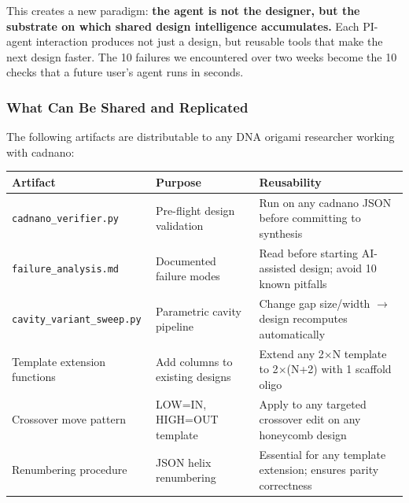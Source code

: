 \documentclass[
  11pt,
]{article}
\newcounter{none} %
\begin{document}
This creates a new paradigm: \textbf{the agent is not the designer, but
the substrate on which shared design intelligence accumulates.} Each
PI-agent interaction produces not just a design, but reusable tools that
make the next design faster. The 10 failures we encountered over two
weeks become the 10 checks that a future user's agent runs in seconds.

\subsubsection{What Can Be Shared and
Replicated}\label{what-can-be-shared-and-replicated}

The following artifacts are distributable to any DNA origami researcher
working with cadnano:

{\def\LTcaptype{none} %
\begin{longtable}[]{@{}
  >{\raggedright\arraybackslash}p{}
  >{\raggedright\arraybackslash}p{}
  >{\raggedright\arraybackslash}p{}@{}}
\toprule\noalign{}
\begin{minipage}[b]{\linewidth}\raggedright
Artifact
\end{minipage} & \begin{minipage}[b]{\linewidth}\raggedright
Purpose
\end{minipage} & \begin{minipage}[b]{\linewidth}\raggedright
Reusability
\end{minipage} \\
\midrule\noalign{}
\endhead
\bottomrule\noalign{}
\endlastfoot
\texttt{cadnano\_verifier.py} & Pre-flight design validation & Run on
any cadnano JSON before committing to synthesis \\
\texttt{failure\_analysis.md} & Documented failure modes & Read before
starting AI-assisted design; avoid 10 known pitfalls \\
\texttt{cavity\_variant\_sweep.py} & Parametric cavity pipeline & Change
gap size/width $\to$ design recomputes automatically \\
Template extension functions & Add columns to existing designs & Extend
any 2$\times$N template to 2$\times$(N+2) with 1 scaffold oligo \\
Crossover move pattern & LOW=IN, HIGH=OUT template & Apply to any
targeted crossover edit on any honeycomb design \\
Renumbering procedure & JSON helix renumbering & Essential for any
template extension; ensures parity correctness \\
\end{longtable}
}
\end{document}
